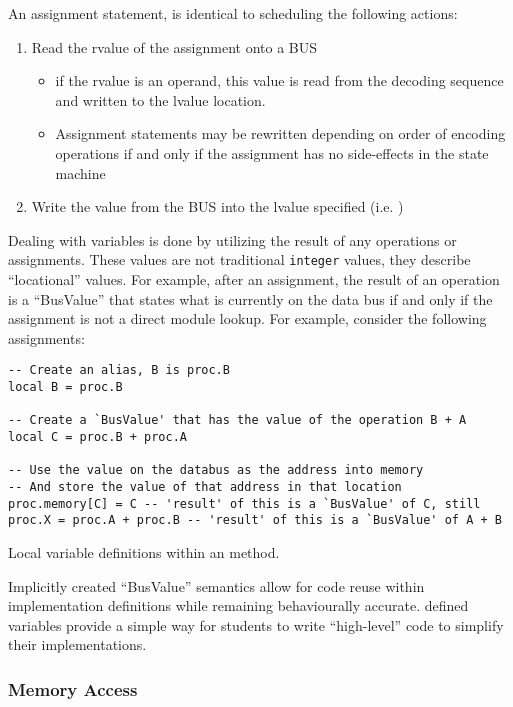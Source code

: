 An assignment statement,  is identical to scheduling the following actions: 
\begin{enumerate}
    \item Read the rvalue \cite{cppreference:ValueCategories} of the assignment onto a BUS
    \begin{itemize}
        \item if the rvalue is an operand, this value is read from the decoding sequence and written to the lvalue \cite{cppreference:ValueCategories} location.
        \item Assignment statements may be rewritten depending on order of encoding operations if and only if the assignment has no side-effects in the state machine
    \end{itemize}
    \item Write the value from the BUS into the lvalue specified (i.e. )
\end{enumerate}
Dealing with  variables is done by utilizing the result of any operations or assignments. These values are not traditional \texttt{integer} values, they describe ``locational'' values. For example, after an assignment, the result of an operation is a ``BusValue'' that states what is currently on the data bus if and only if the assignment is not a direct module lookup. For example, consider the following  assignments: 
\begin{listing}[h!]
\begin{verbatim}
-- Create an alias, B is proc.B
local B = proc.B

-- Create a `BusValue' that has the value of the operation B + A
local C = proc.B + proc.A

-- Use the value on the databus as the address into memory
-- And store the value of that address in that location
proc.memory[C] = C -- 'result' of this is a `BusValue' of C, still
proc.X = proc.A + proc.B -- 'result' of this is a `BusValue' of A + B
\end{verbatim}
\caption{Local variable definitions within an  method.}
\end{listing}
Implicitly created ``BusValue'' semantics allow for code reuse within implementation definitions while remaining behaviourally accurate.  defined variables provide a simple way for students to write ``high-level'' code to simplify their implementations.

\subsubsection*{Memory Access}

